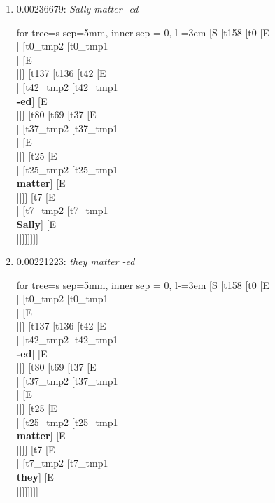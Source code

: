 \documentclass[11pt]{article}
\begin{document}
\begin{enumerate}
	\item  0.00236679: \textit{Sally matter -ed} \\[0.5em]
	\begin{forest}
	for tree={s sep=5mm, inner sep = 0, l-=3em}
	[S [t158 [t0 [E\\ ] [t0_tmp2 [t0_tmp1\\ ] [E\\ ]]] [t137 [t136 [t42 [E\\ ] [t42_tmp2 [t42_tmp1\\\textbf{-ed}] [E\\ ]]] [t80 [t69 [t37 [E\\ ] [t37_tmp2 [t37_tmp1\\ ] [E\\ ]]] [t25 [E\\ ] [t25_tmp2 [t25_tmp1\\\textbf{matter}] [E\\ ]]]] [t7 [E\\ ] [t7_tmp2 [t7_tmp1\\\textbf{Sally}] [E\\ ]]]]]]]]
	\end{forest}
	\newpage

	\item  0.00221223: \textit{they matter -ed} \\[0.5em]
	\begin{forest}
	for tree={s sep=5mm, inner sep = 0, l-=3em}
	[S [t158 [t0 [E\\ ] [t0_tmp2 [t0_tmp1\\ ] [E\\ ]]] [t137 [t136 [t42 [E\\ ] [t42_tmp2 [t42_tmp1\\\textbf{-ed}] [E\\ ]]] [t80 [t69 [t37 [E\\ ] [t37_tmp2 [t37_tmp1\\ ] [E\\ ]]] [t25 [E\\ ] [t25_tmp2 [t25_tmp1\\\textbf{matter}] [E\\ ]]]] [t7 [E\\ ] [t7_tmp2 [t7_tmp1\\\textbf{they}] [E\\ ]]]]]]]]
	\end{forest}
	\newpage


\end{enumerate}
\end{document}
